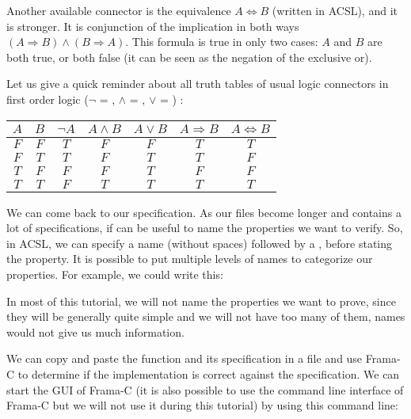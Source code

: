 Another available connector is the equivalence $A \Leftrightarrow B$
(written  in ACSL), and it is
stronger. It is conjunction of the implication in both ways
$(A \Rightarrow B) \wedge (B \Rightarrow A)$. This formula is true in
only two cases: $A$ and $B$ are both true, or both false (it can be seen
as the negation of the exclusive or).



\begin{Information}
  Let us give a quick reminder about all
  truth tables of usual logic connectors in first order logic
  ($\neg$ = \CodeInline{!}, $\wedge$ = \CodeInline{\&\&}, $\vee$ = \CodeInline{||}) :

\begin{longtabu}{|c|c|c|c|c|c|c|} \hline
$A$ & $B$ & $\neg A$ & $A \wedge B$ & $A \vee B$ & $A \Rightarrow B$ & $A \Leftrightarrow B$ \\ \hline
$F$ & $F$ & $T$ & $F$ & $F$ & $T$ & $T$ \\ \hline
$F$ & $T$ & $T$ & $F$ & $T$ & $T$ & $F$ \\ \hline
$T$ & $F$ & $F$ & $F$ & $T$ & $F$ & $F$ \\ \hline
$T$ & $T$ & $F$ & $T$ & $T$ & $T$ & $T$ \\ \hline
\end{longtabu}
\end{Information}


We can come back to our specification. As our files become longer and
contains a lot of specifications, if can be useful to name the
properties we want to verify. So, in ACSL, we can specify a name
(without spaces) followed by a \CodeInline{:}, before stating the property.
It is possible to put multiple levels of names to categorize our
properties. For example, we could write this:






In most of this tutorial, we will not name the properties we want to
prove, since they will be generally quite simple and we will not have
too many of them, names would not give us much information.

We can copy and paste the function  and its specification in
a file  and use Frama-C to determine if the implementation
is correct against the specification. We can start the GUI of Frama-C
(it is also possible to use the command line interface of Frama-C but we
will not use it during this tutorial) by using this command line:



